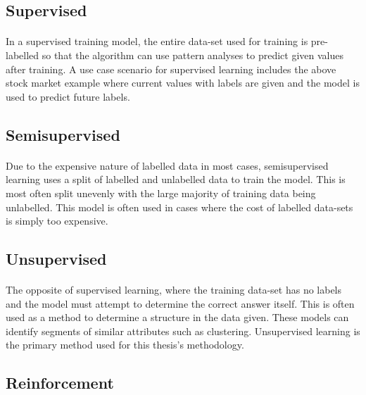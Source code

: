 \subsection{Supervised}
\label{ssec:subsection3}

\paragraph{}In a supervised training model, the entire data-set used for training is pre-labelled so that the algorithm can use pattern analyses to predict given values after training. A use case scenario for supervised learning includes the above stock market example where current values with labels are given and the model is used to predict future labels.

\subsection{Semisupervised} 
\label{ssec:subsection4}

\paragraph{}Due to the expensive nature of labelled data in most cases, semisupervised learning uses a split of labelled and unlabelled data to train the model. This is most often split unevenly with the large majority of training data being unlabelled. This model is often used in cases where the cost of labelled data-sets is simply too expensive.

\subsection{Unsupervised} 
\label{ssec:subsection5}

\paragraph{}The opposite of supervised learning, where the training data-set has no labels and the model must attempt to determine the correct answer itself. This is often used as a method to determine a structure in the data given. These models can identify segments of similar attributes such as clustering. Unsupervised learning is the primary method used for this thesis's methodology.

\subsection{Reinforcement} 
\label{ssec:subsection6}
